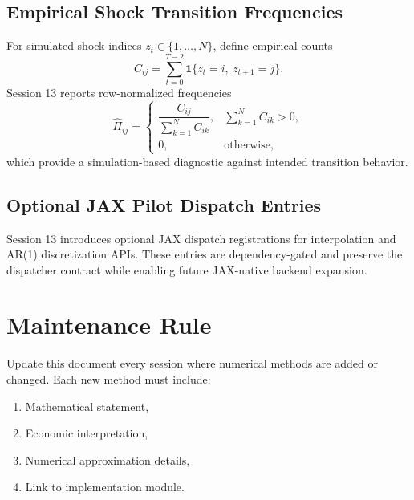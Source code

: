 \documentclass[11pt]{article}
\begin{document}
\subsection{Empirical Shock Transition Frequencies}
For simulated shock indices \(z_t \in \{1,\dots,N\}\), define empirical counts
\begin{equation}
    C_{ij} = \sum_{t=0}^{T-2} \mathbf{1}\{z_t=i,\ z_{t+1}=j\}.
\end{equation}
Session 13 reports row-normalized frequencies
\begin{equation}
    \widehat{\Pi}_{ij} =
    \begin{cases}
        \dfrac{C_{ij}}{\sum_{k=1}^{N} C_{ik}}, & \sum_{k=1}^{N} C_{ik} > 0,\\
        0, & \text{otherwise},
    \end{cases}
\end{equation}
which provide a simulation-based diagnostic against intended transition behavior.

\subsection{Optional JAX Pilot Dispatch Entries}
Session 13 introduces optional JAX dispatch registrations for interpolation and
AR(1) discretization APIs. These entries are dependency-gated and preserve the
dispatcher contract while enabling future JAX-native backend expansion.

\section{Maintenance Rule}
Update this document every session where numerical methods are added or changed.
Each new method must include:
\begin{enumerate}
    \item Mathematical statement,
    \item Economic interpretation,
    \item Numerical approximation details,
    \item Link to implementation module.
\end{enumerate}
\end{document}
